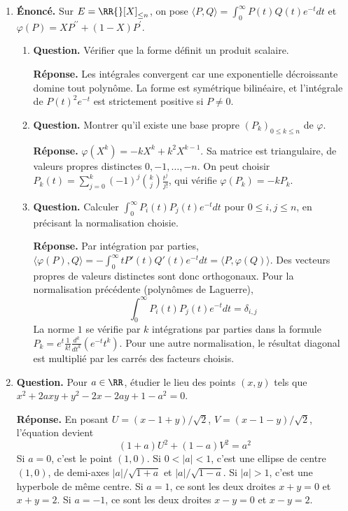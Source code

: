 \documentclass[12pt, a4paper]{article}
\begin{document}
\begin{enumerate}[label=9.\arabic*., start=94]
  \item \begin{minipage}[t]{\linewidth}\raggedright
\textbf{Énoncé.} Sur $E=\RR{}[X]_{\leq n}$, on pose $\langle P,Q\rangle=\int_0^\infty P(t)Q(t)e^{-t}dt$ et $\varphi(P)=XP^{\prime\prime}+(1-X)P^{\prime}$.

\begin{enumerate}[\arabic*.]
        \item \textbf{Question.} Vérifier que la forme définit un produit scalaire.
\par\smallskip
\textbf{Réponse.} Les intégrales convergent car une exponentielle décroissante domine tout polynôme.
        La forme est symétrique bilinéaire, et l'intégrale de $P(t)^2e^{-t}$ est strictement positive si $P\neq0$.

  \item \textbf{Question.} Montrer qu’il existe une base propre $(P_k)_{0\leq k\leq n}$ de $\varphi$.
\par\smallskip
\textbf{Réponse.} $\varphi(X^k)=-kX^k+k^2X^{k-1}$.
        Sa matrice est triangulaire, de valeurs propres distinctes $0,-1,\ldots,-n$.
        On peut choisir
        $\displaystyle P_k(t)=\sum_{j=0}^k(-1)^j\binom kj\frac{t^j}{j!}$, qui vérifie $\varphi(P_k)=-kP_k$.

  \item \textbf{Question.} Calculer $\int_0^\infty P_i(t)P_j(t)e^{-t}dt$ pour $0\leq i,j\leq n$, en précisant la normalisation choisie.
\par\smallskip
\textbf{Réponse.} Par intégration par parties,
        $\langle\varphi(P),Q\rangle=-\int_0^\infty tP'(t)Q'(t)e^{-t}dt=\langle P,\varphi(Q)\rangle$.
        Des vecteurs propres de valeurs distinctes sont donc orthogonaux.
        Pour la normalisation précédente (polynômes de Laguerre),
        \[
          \int_0^\infty P_i(t)P_j(t)e^{-t}dt=\delta_{i,j}
        \]
        La norme $1$ se vérifie par $k$ intégrations par parties dans la formule
        $P_k=e^t\frac1{k!}\frac{d^k}{dt^k}(e^{-t}t^k)$.
        Pour une autre normalisation, le résultat diagonal est multiplié par les carrés des facteurs choisis.

\end{enumerate}
\end{minipage}

  \item \begin{minipage}[t]{\linewidth}\raggedright
\textbf{Question.} Pour $a\in\RR$, étudier le lieu des points $(x,y)$ tels que $x^2+2axy+y^2-2x-2ay+1-a^2=0$.
\par\smallskip
\textbf{Réponse.} En posant $U=(x-1+y)/\sqrt2$, $V=(x-1-y)/\sqrt2$, l'équation devient
    \[
      (1+a)U^2+(1-a)V^2=a^2
    \]
    Si $a=0$, c'est le point $(1,0)$.
    Si $0<|a|<1$, c'est une ellipse de centre $(1,0)$, de demi-axes $|a|/\sqrt{1+a}$ et $|a|/\sqrt{1-a}$.
    Si $|a|>1$, c'est une hyperbole de même centre.
    Si $a=1$, ce sont les deux droites $x+y=0$ et $x+y=2$.
    Si $a=-1$, ce sont les deux droites $x-y=0$ et $x-y=2$.
\end{minipage}


\end{enumerate}
\end{document}
